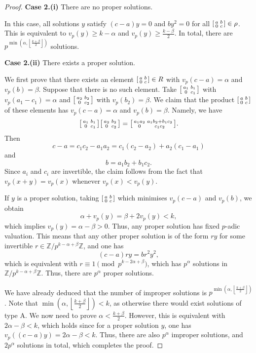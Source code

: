 \documentclass[10pt,leqno]{amsart}
\newcommand\sm[1]{\begin{bsmallmatrix}#1\end{bsmallmatrix}}
\newcommand{\Z}{\mathbb{Z}}
\theoremstyle{definition}
\theoremstyle{remark}
\numberwithin{theorem}{section}
\begin{document}
\begin{proof}
\noindent \textbf{Case 2.(i)}  There are no proper solutions. 

In this case, all solutions $y$ satisfy $(c-a)y=0$ and $by^2=0$ for all $\sm{a & b \\0 & c}\in \rho$. This is equivalent to $v_p(y)\geq k-\alpha$ and $v_p(y)\geq \frac{k-\beta}{2}$. In total, there are $p^{\min\left(\alpha, \left\lfloor \frac{k+\beta}{2} \right\rfloor \right)}$ solutions.

\noindent \textbf{Case 2.(ii)} There exists a proper solution. 

We first prove that there exists an element $\sm{a & b \\0 & c}\in R$ with $v_p(c-a)=\alpha$ and $v_p(b)=\beta$. Suppose that there is no such element. Take $\sm{a_1 & b_1 \\
    0 & c_1}$ with $v_p(a_1-c_1)=\alpha$ and $\sm{a_2 & b_2 \\ 0 & c_2}$ with $v_p(b_2)=\beta$. We claim that the product $\sm{a & b \\ 0 & c}$ of these elements has $v_p(c-a)=\alpha$ and $v_p(b)=\beta$. Namely, we have $$\sm{a_1 & b_1 \\
     0 & c_1}\sm{a_2 & b_2 \\ 0 & c_2}=\sm{a_1a_2 & a_1b_2+b_1c_2 \\
     0 & c_1c_2}.$$
Then $$c-a=c_1c_2-a_1a_2=c_1(c_2-a_2)+a_2(c_1-a_1)$$ and $$b=a_1b_2+b_1c_2.$$ Since $a_i$ and $c_i$ are invertible, the claim follows from the fact that $v_p(x+y)=v_p(x)$ whenever $v_p(x)<v_p(y)$.


If $y$ is a proper solution, taking $\sm{a & b \\ 0 & c}$ which minimises $v_p(c-a)$ and $v_p(b)$, we obtain $$\alpha+v_p(y)=\beta+2v_p(y)<k,$$
which implies $v_p(y)=\alpha-\beta>0$. Thus, any proper solution has fixed $p$-adic valuation. This means that any other proper solution is of the form $ry$ for some invertible $r \in \Z/p^{k-\alpha+\beta}\Z$, and one has $$(c-a)ry=br^2y^2,$$ which is equivalent with $r\equiv 1 \pmod{p^{k-2\alpha+\beta}}$, which has $p^\alpha$ solutions in $\Z/p^{k-\alpha+\beta}\Z$. Thus, there are $p^\alpha$ proper solutions.

We have already deduced that the number of improper solutions is $p^{\min\left(\alpha, \left\lfloor \frac{k+\beta}{2} \right\rfloor \right)}$. Note that $\min\left(\alpha, \left\lfloor \frac{k+\beta}{2} \right\rfloor \right)<k$, as otherwise there would exist solutions of type A. We now need to prove $\alpha < \frac{k+\beta}{2}$. However, this is equivalent with $2\alpha-\beta<k$, which holds since for a proper solution $y$, one has $v_p((c-a)y)=2\alpha-\beta<k$. Thus, there are also $p^\alpha$ improper solutions, and $2p^\alpha$ solutions in total, which completes the proof.
\end{proof}
\end{document}
